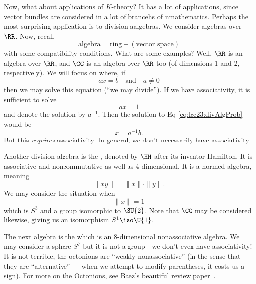 Now, what about applications of $K$-theory? It has a lot of
applications, since vector bundles are considered in a lot of
brancehs of nmathematics. Perhaps the most surprising application
is to division aalgebras. We consider algebras over $\RR$. Now,
recall
\begin{equation}
\mbox{algebra} = \mbox{ring}+(\mbox{vector space})
\end{equation}
with some compatibility conditions. What are some examples? Well,
$\RR$ is an algebra over $\RR$, and $\CC$ is an algebra over
$\RR$ too (of dimensions 1 and 2, respectively). We will focus on
 where, if 
\begin{equation}\label{eq:lec23:divAlgProb}
ax=b\quad\mbox{and}\quad a\not=0
\end{equation}
then we may solve this equation (``we may divide''). If we have
associativity, it is sufficient to solve
\begin{equation}
ax=1
\end{equation}
and denote the solution by $a^{-1}$. Then the solution to Eq
\eqref{eq:lec23:divAlgProb} would be
\begin{equation}
x=a^{-1}b.
\end{equation}
But this \emph{requires} associativity. In general, we don't
necessarily have associativity.

Another division algebra is the
, denoted by $\HH$ after its inventor
Hamilton. It is associative and noncommutative as well as
4-dimensional. It is a normed algebra, meaning
\begin{equation}
\|xy\|=\|x\|\cdot\|y\|.
\end{equation}
We may consider the situation when
\begin{equation}
\|x\|=1
\end{equation}
which is $S^{3}$ and a group isomorphic to $\SU{2}$. Note that
$\CC$ may be considered likewise, giving us an isomorphism
$S^{1}\iso\U{1}$. 

The next algebra is the 
which is an 8-dimensional nonassociative algebra. We may consider
a sphere $S^{7}$ but it is not a group---we don't even have associativity!
It is not terrible, the octonions are ``weakly nonassociative''
(in the sense that they are ``alternative'' --- when we attempt
to modify parentheses, it costs us a sign).
For more on the Octonions, see Baez's beautiful review paper~\cite{baez}.

